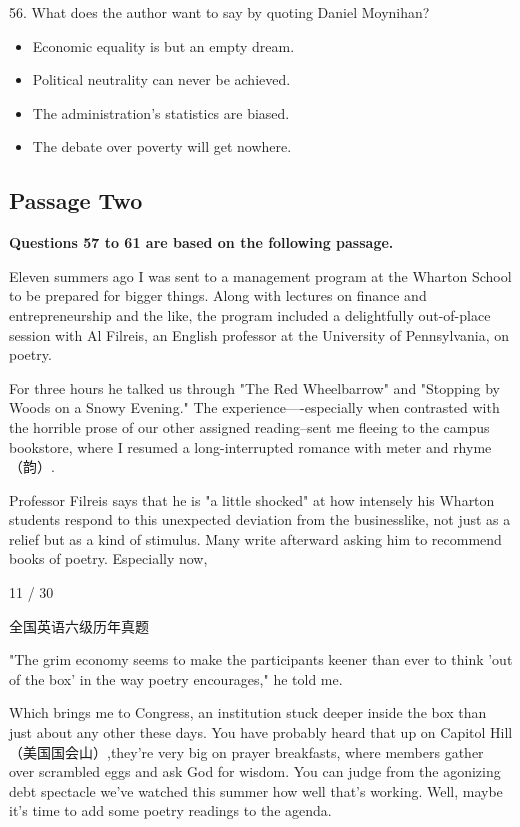 \documentclass[UTF8,11pt]{ctexart}
\begin{document}
56. What does the author want to say by quoting Daniel Moynihan?


\begin{itemize}[leftmargin=2em,itemsep=.2em,topsep=.4em]\item[A.] Economic equality is but an empty dream.
\item[B.] Political neutrality can never be achieved.
\item[C.] The administration's statistics are biased.
\item[D.] The debate over poverty will get nowhere.
\end{itemize}

\subsection*{\textbf{Passage Two}}


\textbf{Questions 57 to 61 are based on the following passage.}


Eleven summers ago I was sent to a management program at the Wharton School to be prepared for bigger things. Along with lectures on finance and entrepreneurship and the like, the program included a delightfully out-of-place session with Al Filreis, an English professor at the University of Pennsylvania, on poetry.


For three hours he talked us through "The Red Wheelbarrow" and "Stopping by Woods on a Snowy Evening." The experience----especially when contrasted with the horrible prose of our other assigned reading--sent me fleeing to the campus bookstore, where I resumed a long-interrupted romance with meter and rhyme（韵）.


Professor Filreis says that he is "a little shocked" at how intensely his Wharton students respond to this unexpected deviation from the businesslike, not just as a relief but as a kind of stimulus. Many write afterward asking him to recommend books of poetry. Especially now,


11 / 30


全国英语六级历年真题


"The grim economy seems to make the participants keener than ever to think 'out of the box' in the way poetry encourages," he told me.


Which brings me to Congress, an institution stuck deeper inside the box than just about any other these days. You have probably heard that up on Capitol Hill（美国国会山）,they're very big on prayer breakfasts, where members gather over scrambled eggs and ask God for wisdom. You can judge from the agonizing debt spectacle we've watched this summer how well that's working. Well, maybe it's time to add some poetry readings to the agenda.
\end{document}
